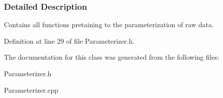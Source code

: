 \subsubsection{Detailed Description}
Contains all functions pretaining to the parameterization of raw data. 

Definition at line 29 of file Parameterizer.h.



The documentation for this class was generated from the following files:\begin{DoxyCompactItemize}
\item 
Parameterizer.h\item 
Parameterizer.cpp\end{DoxyCompactItemize}
